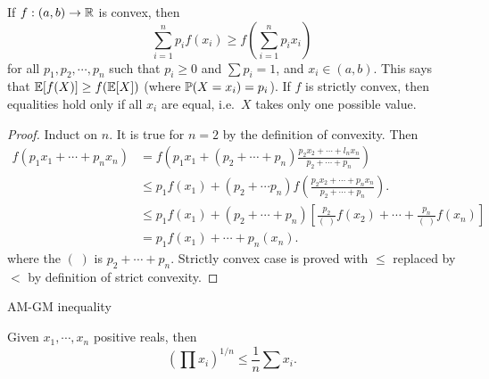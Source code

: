 %
\begin{note}
  \begin{field}
    \begin{thm}
      If $f:(a, b) \to \R$ is convex, then
      \[
        \sum_{i = 1}^n p_i f(x_i) \geq f\left(\sum_{i = 1}^n p_ix_i\right)
      \]
      for all $p_1, p_2, \cdots, p_n$ such that $p_i \geq 0$ and $\sum p_i = 1$, and $x_i \in (a, b)$.
      This says that $\E[f(X)] \geq f(\E[X])$ (where $\P(X=x_i) = p_i$).
      If $f$ is strictly convex, then equalities hold only if all $x_i$ are equal, i.e.\ $X$ takes only one possible value.
    \end{thm}
  \end{field}
  \begin{field}
    \begin{proof}
      Induct on $n$. It is true for $n = 2$ by the definition of convexity. Then
      \begin{align*}
        f(p_1x_1 + \cdots + p_nx_n) &= f\left(p_1x_1 + (p_2 + \cdots + p_n)\frac{p_2x_2 + \cdots + l_nx_n}{p_2 + \cdots + p_n}\right)\\
        &\leq p_1f(x_1) + (p_2 + \cdots p_n)f\left(\frac{p_2x_2 + \cdots + p_n x_n}{p_2 + \cdots + p_n }\right).\\
        &\leq p_1f(x_1) + (p_2 + \cdots + p_n)\left[\frac{p_2}{(\;)}f(x_2) + \cdots + \frac{p_n}{(\;)}f(x_n)\right]\\
        &= p_1f(x_1) + \cdots + p_n(x_n).
      \end{align*}
      where the $(\;)$ is $p_2 + \cdots + p_n$.
      Strictly convex case is proved with $\leq$ replaced by $<$ by definition of strict convexity.
    \end{proof}
  \end{field}
  \xplain{}%
\end{note}

%
\begin{note}
  \begin{field}
    AM-GM inequality
  \end{field}
  \begin{field}
    \begin{cor}[AM-GM inequality]
      Given $x_1, \cdots, x_n$ positive reals, then
      \[
        \left(\prod x_i\right)^{1/n} \leq \frac{1}{n}\sum x_i.
      \]
    \end{cor}
  \end{field}
  \xplain{}%
\end{note}


